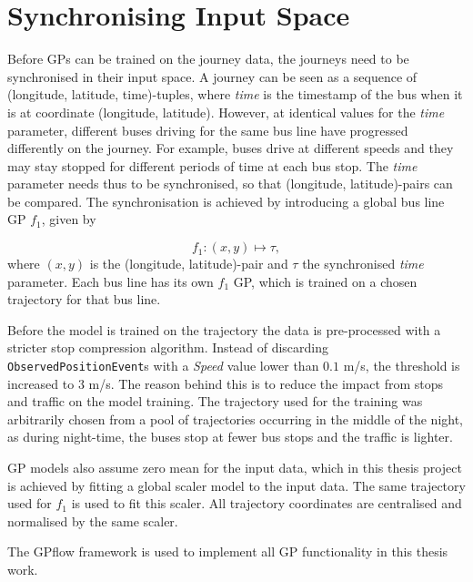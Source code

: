 \section{Synchronising Input Space} \label{sec:synchronisation}
Before GPs can be trained on the journey data, the journeys need to be synchronised in their input space.
A journey can be seen as a sequence of (longitude, latitude, time)-tuples, where \textit{time} is the timestamp of the bus when it is at coordinate (longitude, latitude).
However, at identical values for the \textit{time} parameter, different buses driving for the same bus line have progressed differently on the journey.
For example, buses drive at different speeds and they may stay stopped for different periods of time at each bus stop.
The \textit{time} parameter needs thus to be synchronised, so that (longitude, latitude)-pairs can be compared.
The synchronisation is achieved by introducing a global bus line GP $f_1$, given by

\begin{equation} \label{eq:gps-var-f1}
    f_1: (x, y) \longmapsto \tau,
 \end{equation}
where $(x, y)$ is the (longitude, latitude)-pair and $\tau$ the synchronised \textit{time} parameter.
Each bus line has its own $f_1$ GP, which is trained on a chosen trajectory for that bus line.

Before the model is trained on the trajectory the data is pre-processed with a stricter stop compression algorithm.
Instead of discarding \texttt{ObservedPositionEvent}s with a \textit{Speed} value lower than $0.1$ m/s, the threshold is increased to $3$ m/s.
The reason behind this is to reduce the impact from stops and traffic on the model training.
The trajectory used for the training was arbitrarily chosen from a pool of trajectories occurring in the middle of the night, as during night-time, the buses stop at fewer bus stops and the traffic is lighter.

GP models also assume zero mean for the input data, which in this thesis project is achieved by fitting a global scaler model to the input data.
The same trajectory used for $f_1$ is used to fit this scaler.
All trajectory coordinates are centralised and normalised by the same scaler.

The GPflow framework \cite{GPflow2017} is used to implement all GP functionality in this thesis work. 

